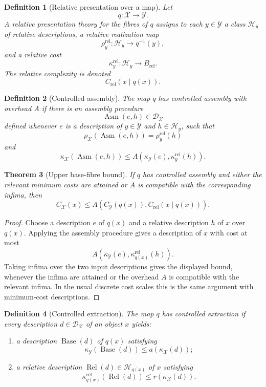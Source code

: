 \documentclass[11pt]{article}
\newtheorem{theorem}{Theorem}[section]
\newtheorem{definition}[theorem]{Definition}
\begin{document}
\begin{definition}[Relative presentation over a map]
Let
\[
q:\mathcal X\to\mathcal Y.
\]
A relative presentation theory for the fibres of \(q\) assigns to each \(y\in\mathcal Y\) a class \(\mathcal H_y\) of relative descriptions, a relative realization map
\[
\rho_y^{\mathrm{rel}}:\mathcal H_y\to q^{-1}(y),
\]
and a relative cost
\[
\kappa_y^{\mathrm{rel}}:\mathcal H_y\to B_{\mathrm{rel}}.
\]
The relative complexity is denoted
\[
C_{\mathrm{rel}}(x\mid q(x)).
\]
\end{definition}

\begin{definition}[Controlled assembly]
The map \(q\) has controlled assembly with overhead \(A\) if there is an assembly procedure
\[
\operatorname{Asm}(e,h)\in\mathcal D_\mathcal X
\]
defined whenever \(e\) is a description of \(y\in\mathcal Y\) and \(h\in\mathcal H_y\), such that
\[
\rho_\mathcal X(\operatorname{Asm}(e,h))=\rho_y^{\mathrm{rel}}(h)
\]
and
\[
\kappa_\mathcal X(\operatorname{Asm}(e,h))
\leq
A(\kappa_\mathcal Y(e),\kappa_y^{\mathrm{rel}}(h)).
\]
\end{definition}

\begin{theorem}[Upper base-fibre bound]
If \(q\) has controlled assembly and either the relevant minimum costs are attained or \(A\) is compatible with the corresponding infima, then
\[
C_\mathcal X(x)
\leq
A(C_\mathcal Y(q(x)),C_{\mathrm{rel}}(x\mid q(x))).
\]
\end{theorem}

\begin{proof}
Choose a description \(e\) of \(q(x)\) and a relative description \(h\) of \(x\) over \(q(x)\). Applying the assembly procedure gives a description of \(x\) with cost at most
\[
A(\kappa_\mathcal Y(e),\kappa_{q(x)}^{\mathrm{rel}}(h)).
\]
Taking infima over the two input descriptions gives the displayed bound, whenever the infima are attained or the overhead \(A\) is compatible with the relevant infima. In the usual discrete cost scales this is the same argument with minimum-cost descriptions.
\end{proof}

\begin{definition}[Controlled extraction]
The map \(q\) has controlled extraction if every description \(d\in\mathcal D_\mathcal X\) of an object \(x\) yields:
\begin{enumerate}[label=(\roman*)]
\item a description \(\operatorname{Base}(d)\) of \(q(x)\) satisfying
\[
\kappa_\mathcal Y(\operatorname{Base}(d))\leq a(\kappa_\mathcal X(d));
\]
\item a relative description \(\operatorname{Rel}(d)\in\mathcal H_{q(x)}\) of \(x\) satisfying
\[
\kappa_{q(x)}^{\mathrm{rel}}(\operatorname{Rel}(d))\leq r(\kappa_\mathcal X(d)).
\]
\end{enumerate}
\end{definition}
\end{document}
